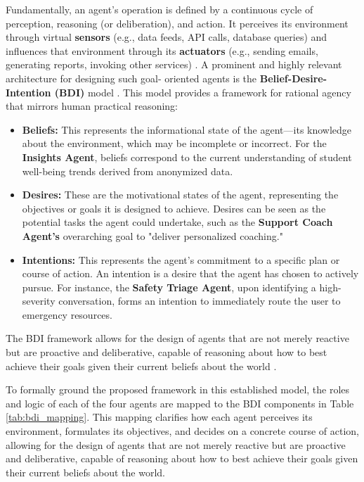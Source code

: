 Fundamentally, an agent's operation is defined by a continuous cycle of perception, reasoning (or deliberation), and action. It perceives its environment through virtual \textbf{sensors} (e.g., data feeds, API calls, database queries) and influences that environment through its \textbf{actuators} (e.g., sending emails, generating reports, invoking other services) \cite{yan2024explainablebdi}. A prominent and highly relevant architecture for designing such goal- oriented agents is the \textbf{Belief-Desire-Intention (BDI)} model \cite{rao1995bdi, yan2024explainablebdi}. This model provides a framework for rational agency that mirrors human practical reasoning:

\begin{itemize}
    \item \textbf{Beliefs:} This represents the informational state of the agent—its knowledge about the environment, which may be incomplete or incorrect. For the \textbf{Insights Agent}, beliefs correspond to the current understanding of student well-being trends derived from anonymized data.
    \item \textbf{Desires:} These are the motivational states of the agent, representing the objectives or goals it is designed to achieve. Desires can be seen as the potential tasks the agent could undertake, such as the \textbf{Support Coach Agent's} overarching goal to "deliver personalized coaching."
    \item \textbf{Intentions:} This represents the agent's commitment to a specific plan or course of action. An intention is a desire that the agent has chosen to actively pursue. For instance, the \textbf{Safety Triage Agent}, upon identifying a high-severity conversation, forms an intention to immediately route the user to emergency resources.
\end{itemize}

The BDI framework allows for the design of agents that are not merely reactive but are proactive and deliberative, capable of reasoning about how to best achieve their goals given their current beliefs about the world \cite{wooldridge2009introductionmas, rao1995bdi}.

To formally ground the proposed framework in this established model, the roles and logic of each of the four agents are mapped to the BDI components in Table \ref{tab:bdi_mapping}. This mapping clarifies how each agent perceives its environment, formulates its objectives, and decides on a concrete course of action, allowing for the design of agents that are not merely reactive but are proactive and deliberative, capable of reasoning about how to best achieve their goals given their current beliefs about the world.

